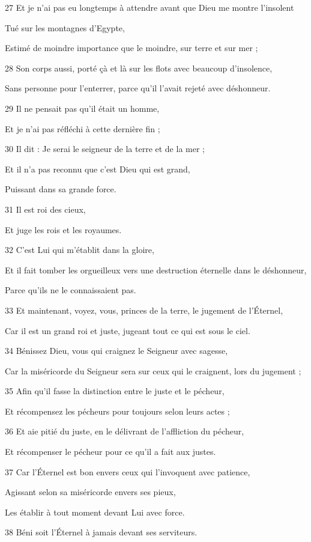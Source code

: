 \par 27 Et je n'ai pas eu longtemps à attendre avant que Dieu me montre l'insolent
\par     Tué sur les montagnes d'Egypte,
\par     Estimé de moindre importance que le moindre, sur terre et sur mer ;
\par 28 Son corps aussi, porté çà et là sur les flots avec beaucoup d'insolence,
\par     Sans personne pour l'enterrer, parce qu'il l'avait rejeté avec déshonneur.
\par 29 Il ne pensait pas qu'il était un homme,
\par     Et je n’ai pas réfléchi à cette dernière fin ;
\par 30 Il dit : Je serai le seigneur de la terre et de la mer ;
\par     Et il n'a pas reconnu que c'est Dieu qui est grand,
\par     Puissant dans sa grande force.
\par 31 Il est roi des cieux,
\par     Et juge les rois et les royaumes.
\par 32 C'est Lui qui m'établit dans la gloire,
\par     Et il fait tomber les orgueilleux vers une destruction éternelle dans le déshonneur,
\par     Parce qu’ils ne le connaissaient pas.
\par 33 Et maintenant, voyez, vous, princes de la terre, le jugement de l'Éternel,
\par     Car il est un grand roi et juste, jugeant tout ce qui est sous le ciel.
\par 34 Bénissez Dieu, vous qui craignez le Seigneur avec sagesse,
\par     Car la miséricorde du Seigneur sera sur ceux qui le craignent, lors du jugement ;
\par 35 Afin qu'il fasse la distinction entre le juste et le pécheur,
\par     Et récompensez les pécheurs pour toujours selon leurs actes ;
\par 36 Et aie pitié du juste, en le délivrant de l'affliction du pécheur,
\par     Et récompenser le pécheur pour ce qu'il a fait aux justes.
\par 37 Car l'Éternel est bon envers ceux qui l'invoquent avec patience,
\par     Agissant selon sa miséricorde envers ses pieux,
\par     Les établir à tout moment devant Lui avec force.
\par 38 Béni soit l'Éternel à jamais devant ses serviteurs.

